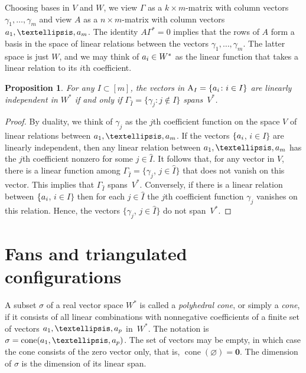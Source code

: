 \documentclass[a4paper]{amsart}
\newtheorem{proposition}[theorem]{Proposition}
\theoremstyle{definition}
\theoremstyle{remark}
\numberwithin{equation}{section}
\newcommand{\mb}[1]{{\textbf {\textit#1}}}
\def\cone{\mathop{\mathrm{cone}}}
\newcommand{\<}{\langle}
\renewcommand{\>}{\rangle}
\begin{document}
Choosing bases in $V$ and $W$, we view $\varGamma$ as a $k\times m$-matrix with column vectors $\gamma_1,\ldots,\gamma_m$ and view $A$ as a $n\times m$-matrix with column vectors $\mb a_1,\ldots,\mb a_m$. The identity $A\varGamma^*=0$ implies that the rows of $A$ form a basis in the space of linear relations between the vectors $\gamma_1,\ldots,\gamma_m$. The latter space is just $W$, and we may think of $\mb a_i\in W^*$ as the linear function that takes a linear relation to its $i$th coefficient.

\begin{proposition}\label{galeindspan}
For any $I\subset[m]$, the vectors in $\mathrm{A}_I=\{\mb a_i\colon i\in I\}$ are linearly independent in $W^*$ if and only if $\Gamma_{\widehat I}=\{\gamma_j\colon j\notin I\}$ spans~$V^*$.  
\end{proposition}
\begin{proof}
By duality, we think of $\gamma_j$ as the $j$th coefficient function on the space $V$ of linear relations between $\mb a_1,\ldots,\mb a_m$. If the vectors $\{\mb a_i$, $i\in I\}$ are linearly independent, then any linear relation between $\mb a_1,\ldots,\mb a_m$ has the $j$th coefficient nonzero for some $j\in\widehat I$. It follows that, for any vector in $V$, there is a linear function among $\Gamma_{\widehat I}=\{\gamma_j$, $j\in\widehat I\}$ that does not vanish on this vector. This implies that $\Gamma_{\widehat I}$ spans~$V^*$. Conversely, if
there is a linear relation between $\{\mb a_i$, $i\in I\}$ then for each $j\in\widehat I$ the $j$th coefficient function $\gamma_j$ vanishes on this relation. Hence, the vectors $\{\gamma_j$, $j\in\widehat I\}$ do not span~$V^*$.
\end{proof}



\section{Fans and triangulated configurations}\label{secfan}

A subset $\sigma$ of a real vector space $W^*$ is called a \emph{polyhedral cone}, or simply a \emph{cone}, if it consists of all linear combinations with nonnegative coefficients of a finite set of vectors $\mb a_1,\ldots,\mb a_p$ in~$W^*$. The notation is $\sigma=\cone(\mb a_1,\ldots,\mb a_p)$. The set of vectors may be empty, in which case the cone consists of the zero vector only, that is,
$\cone(\varnothing)=\mathbf{0}$. The dimension of $\sigma$ is the dimension of its linear span.
\end{document}
